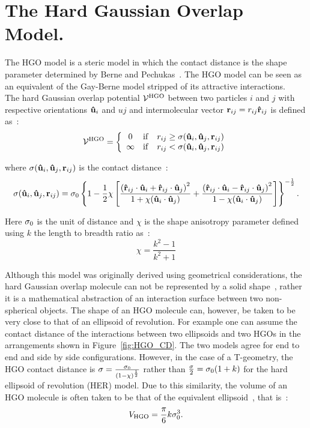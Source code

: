 
\section{The Hard Gaussian Overlap Model.}

The HGO model is a steric model in which the contact distance is the shape parameter determined 
by Berne and Pechukas~\cite{BernePechukas72}. The HGO model can be seen as an
equivalent of the Gay-Berne model stripped of its attractive interactions.\\
The hard Gaussian overlap potential $\mathcal{V}^{\mathrm{HGO}}$ between two particles $i$ and $j$
with respective orientations $\mathbf{\hat{u} }_i$ and $uj$ and intermolecular vector $\mathbf{r}_{ij} = r_{ij}\mathbf{\hat{r} }_{ij}$ is
defined as~:
%
\begin{equation}
	\mathcal{V}^\mrm{HGO} = \left\{  %
	\begin{array}{ccc}
	0	&\mrm{if}	&r_{ij} \geq \sijr	\\
	\infty	&\mrm{if}	&r_{ij}	< \sijr
	\end{array}
	\right.
\end{equation}

where $\sigma(\mathbf{\hat{u} }_i,\mathbf{\hat{u} }_j,\mathbf{r}_{ij})$ is the contact distance~:
\begin{equation}
	\sigma(\mathbf{\hat{u} }_i,\mathbf{\hat{u} }_j,\mathbf{r}_{ij}) = \sigma_0\left\{
	1 - \frac{1}{2}\chi\left[ 
	\frac{ \left(\mathbf{\hat{r} }_{ij} \cdot \mathbf{\hat{u} }_i + \mathbf{\hat{r} }_{ij} \cdot \mathbf{\hat{u} }_j\right)^2 }{1 + \chi(\mathbf{\hat{u} }_i \cdot \mathbf{\hat{u} }_j)}
      + \frac{ \left(\mathbf{\hat{r} }_{ij} \cdot \mathbf{\hat{u} }_i - \mathbf{\hat{r} }_{ij} \cdot \mathbf{\hat{u} }_j\right)^2 }{1 - \chi(\mathbf{\hat{u} }_i \cdot \mathbf{\hat{u} }_j)}
	\right] \right\}^{-\frac{1}{2}}.
\end{equation}

Here $\sigma_0$ is the unit of distance and $\chi$ is the shape anisotropy parameter defined using $k$ the
length to breadth ratio as~:
\begin{equation}
	\chi = \frac{k^2-1}{k^2+1}
\end{equation}

Although this model was originally derived using geometrical considerations, the hard
Gaussian overlap molecule can not be represented by a solid shape~\cite{Rigby89}, rather it 
is a mathematical abstraction of an interaction surface between two non-spherical objects. 
The shape of an HGO molecule can,
however, be taken to be very close to that of an ellipsoid of revolution. For example one can
assume  the contact distance of the interactions between two ellipsoids and two HGOs in the
arrangements shown in Figure~\ref{fig:HGO_CD}. The two models agree for end to end and 
side by side configurations. However, in the case of a T-geometry, 
the HGO contact distance is $\sigma=\frac{\sigma_0}{(1-\chi)^{\frac{1}{2}}}$ rather than
$\frac{\sigma}{2} = \sigma_0(1+k)$ for the hard ellipsoid of revolution (HER) model. 
Due to this similarity, the volume of an HGO molecule is often taken to be that of 
the equivalent ellipsoid~\cite{Rigby89,DeMiguelDelRio01}, that is~:
\begin{equation}
	V_{\mathrm{HGO}} = \frac{\pi}{6}k\sigma_0^3.
\end{equation}

